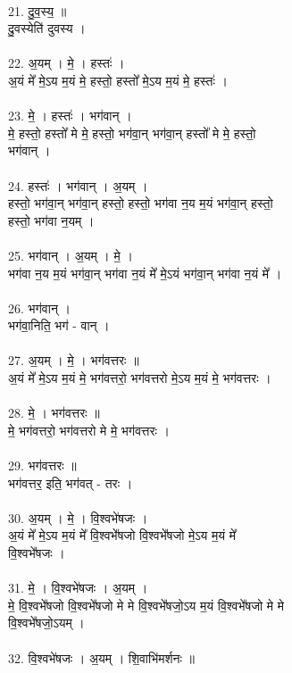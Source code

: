 \\
21. दु॒व॒स्य॒ ॥\\
दु॒वस्येति॑ दुवस्य ।\\
\\
22. अ॒यम् । मे॒ । हस्तः॑ ।\\
अ॒यं मे᳚ मे॒ऽय म॒यं मे॒ हस्तो॒ हस्तो᳚ मे॒ऽय म॒यं मे॒ हस्तः॑ ।\\
\\
23. मे॒ । हस्तः॑ । भग॑वान् ।\\
मे॒ हस्तो॒ हस्तो᳚ मे मे॒ हस्तो॒ भग॑वा॒न् भग॑वा॒न् हस्तो᳚ मे मे॒ हस्तो॒\\
भग॑वान् ।\\
\\
24. हस्तः॑ । भग॑वान् । अ॒यम् ।\\
हस्तो॒ भग॑वा॒न् भग॑वा॒न् हस्तो॒ हस्तो॒ भग॑वा न॒य म॒यं भग॑वा॒न् हस्तो॒\\
हस्तो॒ भग॑वा न॒यम् ।\\
\\
25. भग॑वान् । अ॒यम् । मे॒ ।\\
भग॑वा न॒य म॒यं भग॑वा॒न् भग॑वा न॒यं मे᳚ मे॒ऽयं भग॑वा॒न् भग॑वा न॒यं मे᳚ ।\\
\\
26. भग॑वान् ।\\
भग॑वा॒निति॒ भग॑ - वान् ।\\
\\
27. अ॒यम् । मे॒ । भग॑वत्तरः ॥\\
अ॒यं मे᳚ मे॒ऽय म॒यं मे॒ भग॑वत्तरो॒ भग॑वत्तरो मे॒ऽय म॒यं मे॒ भग॑वत्तरः ।\\
\\
28. मे॒ । भग॑वत्तरः ॥\\
मे॒ भग॑वत्तरो॒ भग॑वत्तरो मे मे॒ भग॑वत्तरः ।\\
\\
29. भग॑वत्तरः ॥\\
भग॑वत्तर॒ इति॒ भग॑वत् - तरः ।\\
\\
30. अ॒यम् । मे॒ । वि॒श्वभे॑षजः ।\\
अ॒यं मे᳚ मे॒ऽय म॒यं मे᳚ वि॒श्वभे᳚षजो वि॒श्वभे᳚षजो मे॒ऽय म॒यं मे᳚\\
वि॒श्वभे᳚षजः ।\\
\\
31. मे॒ । वि॒श्वभे॑षजः । अ॒यम् ।\\
मे॒ वि॒श्वभे᳚षजो वि॒श्वभे᳚षजो मे मे वि॒श्वभे᳚षजो॒ऽय म॒यं वि॒श्वभे᳚षजो मे मे\\
वि॒श्वभे᳚षजो॒ऽयम् ।\\
\\
32. वि॒श्वभे॑षजः । अ॒यम् । शि॒वाभि॑मर्शनः ॥\\
